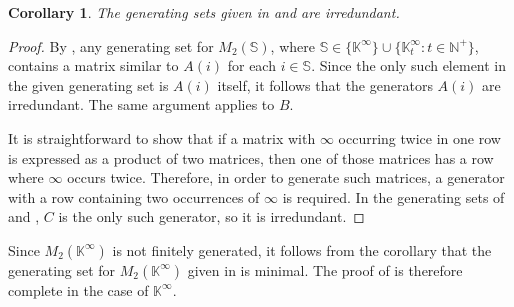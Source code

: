 \documentclass[11pt]{article}
\newtheorem{cor}[thm]{Corollary}
\numberwithin{equation}{section}
\newcommand{\set}[2]{\ensuremath{\{#1 : #2 \}}}
\renewcommand{\S}{\mathbb{S}}
\newcommand{\N}{\mathbb{N}}
\newcommand{\Np}{\N^{+}}
\newcommand{\K}{\mathbb{K}}
\newcommand{\Kmin}{\K^{\infty}}
\newcommand{\Kmint}{\K^{\infty}_t}
\begin{document}
\begin{cor}
  The generating sets given in  and
   are irredundant.
\end{cor}
\begin{proof}
By , any generating set for $M_{2}(\S)$,
where $\S \in \{\Kmin\} \cup \set{\Kmint}{t \in \Np}$, contains a matrix similar
to $A(i)$ for each $i \in \S$. Since the only such element in the given
generating set is $A(i)$ itself, it follows that the generators $A(i)$ are
irredundant. The same argument applies to $B$.

It is straightforward to show that if a matrix with $\infty$ occurring twice in
one row is expressed as a product of two matrices, then one of those matrices
has a row where $\infty$ occurs twice. Therefore, in order to  generate such
matrices, a generator with a row containing two occurrences of $\infty$ is
required. In the generating sets of  and
, $C$ is the only such generator, so it is
irredundant.
\end{proof}

Since $M_2(\Kmin)$ is not finitely generated, it follows from the corollary that
the generating set for $M_2(\Kmin)$ given in  is
minimal. The proof of  is therefore complete in the
case of $\Kmin$.
\end{document}
